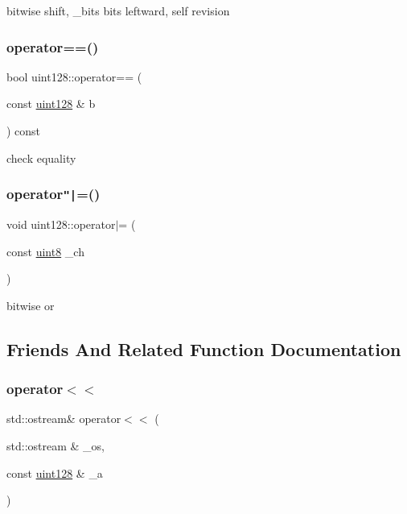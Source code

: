 bitwise shift, \+\_\+bits bits leftward, self revision 

\mbox{\label{classuint128_a0f3b16aec08d80f999b17762b15ed0c5}} 
\subsubsection{\texorpdfstring{operator==()}{operator==()}}
{\footnotesize\ttfamily bool uint128\+::operator== (\begin{DoxyParamCaption}\item[{const \hyperlink{classuint128}{uint128} \&}]{b }\end{DoxyParamCaption}) const\hspace{0.3cm}{\ttfamily [inline]}}



check equality 

\mbox{\label{classuint128_a04bf2e2eb85e66ed7c722a8d5494b0a4}} 
\subsubsection{\texorpdfstring{operator\texttt{"|}=()}{operator|=()}}
{\footnotesize\ttfamily void uint128\+::operator$\vert$= (\begin{DoxyParamCaption}\item[{const \hyperlink{types_8h_a115946cb5fc5879545e9ccea096a6031}{uint8}}]{\+\_\+ch }\end{DoxyParamCaption})\hspace{0.3cm}{\ttfamily [inline]}}



bitwise or 



\subsection{Friends And Related Function Documentation}
\mbox{\label{classuint128_a3981a0cf6398b930fa55fa5c5e802a65}} 
\subsubsection{\texorpdfstring{operator$<$$<$}{operator<<}}
{\footnotesize\ttfamily std\+::ostream\& operator$<$$<$ (\begin{DoxyParamCaption}\item[{std\+::ostream \&}]{\+\_\+os,  }\item[{const \hyperlink{classuint128}{uint128} \&}]{\+\_\+a }\end{DoxyParamCaption})\hspace{0.3cm}{\ttfamily [friend]}}



